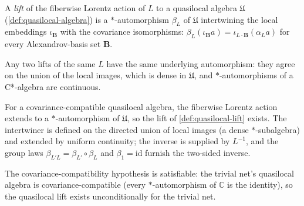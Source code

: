 \begin{definition}
    \label{def:quasilocal-lift}
    \leanok
    A \emph{lift} of the fiberwise Lorentz action of $L$ to a quasilocal algebra $\mathfrak{U}$ (\ref{def:quasilocal-algebra}) is a $*$-automorphism $\beta_L$ of $\mathfrak{U}$ intertwining the local embeddings $\iota_{\mathbf{B}}$ with the covariance isomorphisms: $\beta_L(\iota_{\mathbf{B}} a) = \iota_{L\cdot\mathbf{B}}(\alpha_L a)$ for every Alexandrov-basis set $\mathbf{B}$.
\end{definition}

\begin{lemma}
    \label{lmm:quasilocal-lift-unique}
    \leanok
    Any two lifts of the same $L$ have the same underlying automorphism: they agree on the union of the local images, which is dense in $\mathfrak{U}$, and $*$-automorphisms of a C*-algebra are continuous.
\end{lemma}

\begin{theorem}
    \label{thrm:quasilocal-lift-exists}
    \leanok
    For a covariance-compatible quasilocal algebra, the fiberwise Lorentz action extends to a $*$-automorphism of $\mathfrak{U}$, so the lift of \ref{def:quasilocal-lift} exists. The intertwiner is defined on the directed union of local images (a dense $*$-subalgebra) and extended by uniform continuity; the inverse is supplied by $L^{-1}$, and the group laws $\beta_{L'L} = \beta_{L'}\circ\beta_L$ and $\beta_{1} = \mathrm{id}$ furnish the two-sided inverse.
\end{theorem}

\begin{theorem}
    \label{thrm:quasilocal-lift-trivial}
    \leanok
    The covariance-compatibility hypothesis is satisfiable: the trivial net's quasilocal algebra is covariance-compatible (every $*$-automorphism of $\mathbb{C}$ is the identity), so the quasilocal lift exists unconditionally for the trivial net.
\end{theorem}

